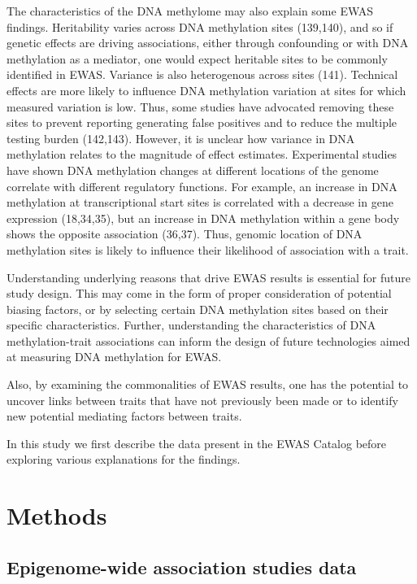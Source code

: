 \documentclass[11pt,oneside]{bristolthesis}
\begin{document}
The characteristics of the DNA methylome may also explain some EWAS findings. Heritability varies across DNA methylation sites (139,140), and so if genetic effects are driving associations, either through confounding or with DNA methylation as a mediator, one would expect heritable sites to be commonly identified in EWAS. Variance is also heterogenous across sites (141). Technical effects are more likely to influence DNA methylation variation at sites for which measured variation is low. Thus, some studies have advocated removing these sites to prevent reporting generating false positives and to reduce the multiple testing burden (142,143). However, it is unclear how variance in DNA methylation relates to the magnitude of effect estimates. Experimental studies have shown DNA methylation changes at different locations of the genome correlate with different regulatory functions. For example, an increase in DNA methylation at transcriptional start sites is correlated with a decrease in gene expression (18,34,35), but an increase in DNA methylation within a gene body shows the opposite association (36,37). Thus, genomic location of DNA methylation sites is likely to influence their likelihood of association with a trait.

Understanding underlying reasons that drive EWAS results is essential for future study design. This may come in the form of proper consideration of potential biasing factors, or by selecting certain DNA methylation sites based on their specific characteristics. Further, understanding the characteristics of DNA methylation-trait associations can inform the design of future technologies aimed at measuring DNA methylation for EWAS.

Also, by examining the commonalities of EWAS results, one has the potential to uncover links between traits that have not previously been made or to identify new potential mediating factors between traits.

In this study we first describe the data present in the EWAS Catalog before exploring various explanations for the findings.

\newpage

\hypertarget{methods-04}{%
\section{Methods}\label{methods-04}}

\hypertarget{epigenome-wide-association-studies-data}{%
\subsection{Epigenome-wide association studies data}\label{epigenome-wide-association-studies-data}}
\end{document}
